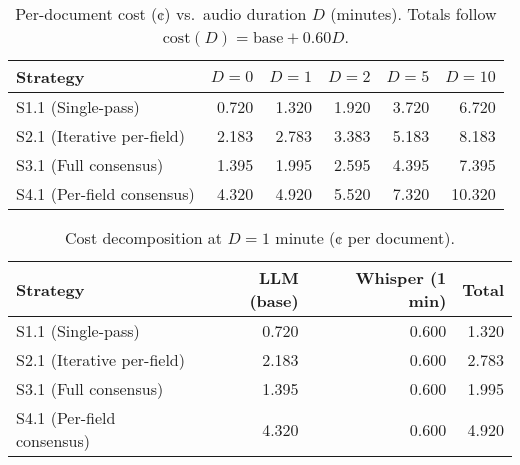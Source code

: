 \begin{table}[H]
\centering
\caption{Per-document cost (¢) vs.\ audio duration $D$ (minutes). Totals follow $\text{cost}(D)=\text{base}+0.60D$.}
\label{tab:cost-vs-audio}
\small
\begin{tabular}{lrrrrr}
\toprule
Strategy & $D{=}0$ & $D{=}1$ & $D{=}2$ & $D{=}5$ & $D{=}10$ \\
\midrule
S1.1 (Single-pass)         & 0.720 & 1.320 & 1.920 & 3.720 & 6.720 \\
S2.1 (Iterative per-field) & 2.183 & 2.783 & 3.383 & 5.183 & 8.183 \\
S3.1 (Full consensus)      & 1.395 & 1.995 & 2.595 & 4.395 & 7.395 \\
S4.1 (Per-field consensus) & 4.320 & 4.920 & 5.520 & 7.320 & 10.320 \\
\bottomrule
\end{tabular}
\end{table}

\begin{table}[H]
\centering
\caption{Cost decomposition at $D{=}1$ minute (¢ per document).}
\label{tab:cost-decomp-d1}
\small
\begin{tabular}{lrrr}
\toprule
Strategy & LLM (base) & Whisper (1 min) & Total \\
\midrule
S1.1 (Single-pass)         & 0.720 & 0.600 & 1.320 \\
S2.1 (Iterative per-field) & 2.183 & 0.600 & 2.783 \\
S3.1 (Full consensus)      & 1.395 & 0.600 & 1.995 \\
S4.1 (Per-field consensus) & 4.320 & 0.600 & 4.920 \\
\bottomrule
\end{tabular}
\end{table}